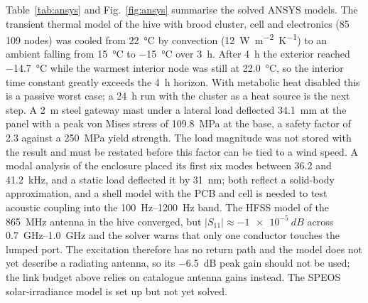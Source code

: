 \documentclass[conference]{IEEEtran}
\begin{document}
Table~\ref{tab:ansys} and Fig.~\ref{fig:ansys} summarise the solved ANSYS models. The transient thermal model of the hive with brood cluster, cell and electronics (85\,109 nodes) was cooled from \SI{22}{\celsius} by convection (\SI{12}{W.m^{-2}.K^{-1}}) to an ambient falling from \SI{15}{\celsius} to \SI{-15}{\celsius} over \SI{3}{h}. After \SI{4}{h} the exterior reached \SI{-14.7}{\celsius} while the warmest interior node was still at \SI{22.0}{\celsius}, so the interior time constant greatly exceeds the \SI{4}{h} horizon. With metabolic heat disabled this is a passive worst case; a \SI{24}{h} run with the cluster as a heat source is the next step. A \SI{2}{m} steel gateway mast under a lateral load deflected \SI{34.1}{mm} at the panel with a peak von Mises stress of \SI{109.8}{MPa} at the base, a safety factor of 2.3 against a \SI{250}{MPa} yield strength. The load magnitude was not stored with the result and must be restated before this factor can be tied to a wind speed. A modal analysis of the enclosure placed its first six modes between 36.2 and \SI{41.2}{kHz}, and a static load deflected it by \SI{31}{nm}; both reflect a solid-body approximation, and a shell model with the PCB and cell is needed to test acoustic coupling into the \SIrange{100}{1200}{Hz} band. The HFSS model of the \SI{865}{MHz} antenna in the hive converged, but $|S_{11}| \approx \SI{-1e-5}{dB}$ across \SIrange{0.7}{1.0}{GHz} and the solver warns that only one conductor touches the lumped port. The excitation therefore has no return path and the model does not yet describe a radiating antenna, so its \SI{-6.5}{dB} peak gain should not be used; the link budget above relies on catalogue antenna gains instead. The SPEOS solar-irradiance model is set up but not yet solved.
\end{document}
